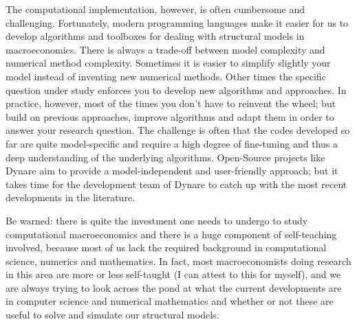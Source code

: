 The computational implementation, however, is often cumbersome and challenging.
Fortunately, modern programming languages make it easier for us to develop algorithms 
  and toolboxes for dealing with structural models in macroeconomics.
There is always a trade-off between model complexity and numerical method complexity.
Sometimes it is easier to simplify slightly your model instead of inventing new numerical methods.
Other times the specific question under study enforces you to develop new algorithms and approaches.
In practice, however, most of the times you don't have to reinvent the wheel; 
  but build on previous approaches, improve algorithms and adapt them in order to answer your research question.
The challenge is often that the codes developed so far are quite model-specific
  and require a high degree of fine-tuning and thus a deep understanding of the underlying algorithms.
Open-Source projects like Dynare aim to provide a model-independent and user-friendly approach;
  but it takes time for the development team of Dynare to catch up with the most recent developments in the literature.

Be warned: there is quite the investment one needs to undergo to study computational macroeconomics
  and there is a huge component of self-teaching involved,
  because most of us lack the required background in computational science, numerics and mathematics.
In fact, most macroeconomists doing research in this area are more or less self-taught (I can attest to this for myself),
  and we are always trying to look across the pond at what the current developments are in computer science and numerical mathematics
  and whether or not these are useful to solve and simulate our structural models.